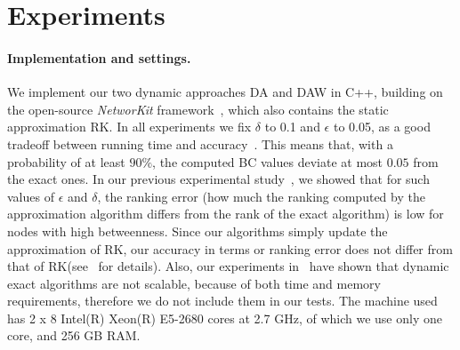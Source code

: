 \documentclass[english]{llncs}
\newcommand{\rk}{\textsf{RK}\xspace}
\begin{document}
\section{Experiments}
\label{sec:experimental}
\paragraph{Implementation and settings.} We implement our two dynamic approaches \textsf{DA} and \textsf{DAW} in C++, building on the open-source \textit{NetworKit} framework~\cite{DBLP:journals/corr/StaudtSM14}, which also contains
the static approximation \textsf{RK}.
In all experiments we fix $\delta$ to 0.1 and $\epsilon$ to 0.05, as a good tradeoff between running time and accuracy~\cite{DBLP:conf/alenex/BergaminiMS15}. 
This means that, with a probability of at least $90\%$, the computed BC values deviate at most
$0.05$ from the exact ones. In our previous experimental study~\cite{DBLP:conf/alenex/BergaminiMS15}, we showed that for such values of $\epsilon$ and $\delta$, the ranking error (how much the ranking computed by the approximation algorithm differs from the rank of the exact algorithm) is low for nodes with high betweenness. Since our algorithms simply update the approximation of \rk, our accuracy in terms or ranking error does not differ from that of \rk (see~\cite{DBLP:conf/alenex/BergaminiMS15} for details). Also, our experiments in~\cite{DBLP:conf/alenex/BergaminiMS15} have shown that dynamic exact algorithms are not scalable, because of both time and memory requirements, therefore we do not include them in our tests.
The machine used has 2 x 8 Intel(R) Xeon(R) E5-2680 cores at 2.7 GHz, of which we use only one core, and 256 GB RAM.
  \vspace{-2ex}
\end{document}
